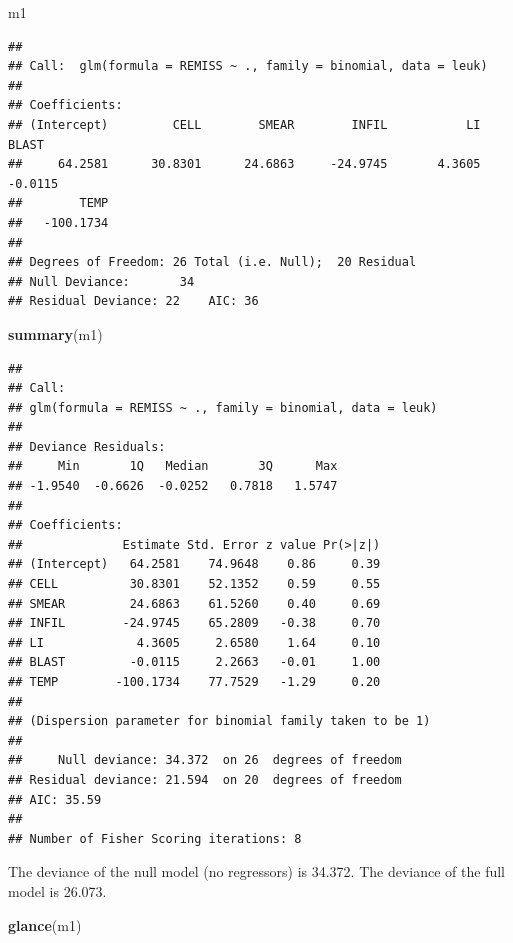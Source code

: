 \documentclass[
]{book}
\newenvironment{Shaded}{\begin{snugshade}}{\end{snugshade}}
\newcommand{\KeywordTok}[1]{\textcolor[rgb]{0.13,0.29,0.53}{\textbf{#1}}}
\newcommand{\NormalTok}[1]{#1}
\begin{document}
\begin{Shaded}
\begin{Highlighting}[]
\NormalTok{m1}
\end{Highlighting}
\end{Shaded}

\begin{verbatim}
## 
## Call:  glm(formula = REMISS ~ ., family = binomial, data = leuk)
## 
## Coefficients:
## (Intercept)         CELL        SMEAR        INFIL           LI        BLAST  
##     64.2581      30.8301      24.6863     -24.9745       4.3605      -0.0115  
##        TEMP  
##   -100.1734  
## 
## Degrees of Freedom: 26 Total (i.e. Null);  20 Residual
## Null Deviance:       34 
## Residual Deviance: 22    AIC: 36
\end{verbatim}

\begin{Shaded}
\begin{Highlighting}[]
\KeywordTok{summary}\NormalTok{(m1)}
\end{Highlighting}
\end{Shaded}

\begin{verbatim}
## 
## Call:
## glm(formula = REMISS ~ ., family = binomial, data = leuk)
## 
## Deviance Residuals: 
##     Min       1Q   Median       3Q      Max  
## -1.9540  -0.6626  -0.0252   0.7818   1.5747  
## 
## Coefficients:
##              Estimate Std. Error z value Pr(>|z|)
## (Intercept)   64.2581    74.9648    0.86     0.39
## CELL          30.8301    52.1352    0.59     0.55
## SMEAR         24.6863    61.5260    0.40     0.69
## INFIL        -24.9745    65.2809   -0.38     0.70
## LI             4.3605     2.6580    1.64     0.10
## BLAST         -0.0115     2.2663   -0.01     1.00
## TEMP        -100.1734    77.7529   -1.29     0.20
## 
## (Dispersion parameter for binomial family taken to be 1)
## 
##     Null deviance: 34.372  on 26  degrees of freedom
## Residual deviance: 21.594  on 20  degrees of freedom
## AIC: 35.59
## 
## Number of Fisher Scoring iterations: 8
\end{verbatim}

The deviance of the null model (no regressors) is 34.372. The deviance of the full model is 26.073.

\begin{Shaded}
\begin{Highlighting}[]
\KeywordTok{glance}\NormalTok{(m1)}
\end{Highlighting}
\end{Shaded}
\end{document}
